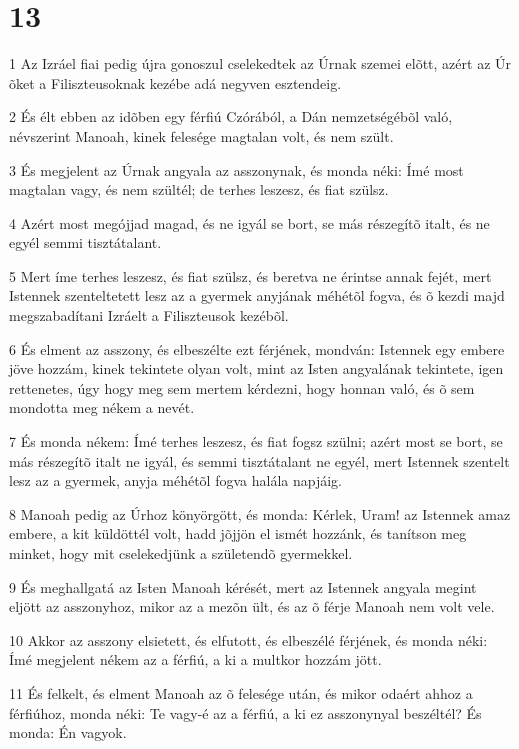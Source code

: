 \chapter{13}

\par 1 Az Izráel fiai pedig újra gonoszul cselekedtek az Úrnak szemei elõtt, azért az Úr õket a Filiszteusoknak kezébe adá negyven esztendeig.
\par 2 És élt ebben az idõben egy férfiú Czórából, a Dán nemzetségébõl való, névszerint Manoah, kinek felesége magtalan volt, és nem szült.
\par 3 És megjelent az Úrnak angyala az asszonynak, és monda néki: Ímé most magtalan vagy, és nem szültél; de terhes leszesz, és fiat szülsz.
\par 4 Azért most megójjad magad, és ne igyál se bort, se más részegítõ italt, és ne egyél semmi tisztátalant.
\par 5 Mert íme terhes leszesz, és fiat szülsz, és beretva ne érintse annak fejét, mert Istennek szenteltetett lesz az a gyermek anyjának méhétõl fogva, és õ kezdi majd megszabadítani Izráelt a Filiszteusok kezébõl.
\par 6 És elment az asszony, és elbeszélte ezt férjének, mondván: Istennek egy embere jöve hozzám, kinek tekintete olyan volt, mint az Isten angyalának tekintete, igen rettenetes, úgy hogy meg sem mertem kérdezni, hogy honnan való, és õ sem mondotta meg nékem a nevét.
\par 7 És monda nékem: Ímé terhes leszesz, és fiat fogsz szülni; azért most se bort, se más részegítõ italt ne igyál, és semmi tisztátalant ne egyél, mert Istennek szentelt lesz az a gyermek, anyja méhétõl fogva halála napjáig.
\par 8 Manoah pedig az Úrhoz könyörgött, és monda: Kérlek, Uram! az Istennek amaz embere, a kit küldöttél volt, hadd jõjjön el ismét hozzánk, és tanítson meg minket, hogy mit cselekedjünk a születendõ gyermekkel.
\par 9 És meghallgatá az Isten Manoah kérését, mert az Istennek angyala megint eljött az asszonyhoz, mikor az a mezõn ült, és az õ férje Manoah nem volt vele.
\par 10 Akkor az asszony elsietett, és elfutott, és elbeszélé férjének, és monda néki: Ímé megjelent nékem az a férfiú, a ki a multkor hozzám jött.
\par 11 És felkelt, és elment Manoah az õ felesége után, és mikor odaért ahhoz a férfiúhoz, monda néki: Te vagy-é az a férfiú, a ki ez asszonynyal beszéltél? És monda: Én vagyok.

